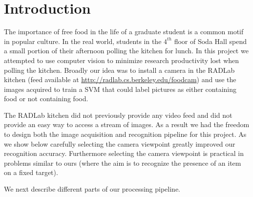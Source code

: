 \section{Introduction}
The importance of free food in the life of a graduate student is a common motif in popular culture. In the real world,
students in the $4^{th}$ floor of Soda Hall spend a small portion of their afternoon polling the kitchen for lunch. In
this project we attempted to use computer vision to minimize research productivity lost when polling the kitchen.
Broadly our idea was to install a camera in the RADLab kitchen (feed available at
\url{http://radlab.cs.berkeley.edu/foodcam}) and use the images acquired to train a SVM that could label pictures as
either containing food or not containing food. 

The RADLab kitchen did not previously provide any video feed and did not provide an easy way to access a stream of
images. As a result we had the freedom to design both the image acquisition and recognition pipeline for this project.
As we show below carefully selecting the camera viewpoint greatly improved our recognition accuracy. Furthermore
selecting the camera viewpoint is practical in problems similar to ours (where the aim is to recognize the presence of
an item on a fixed target). 

We next describe different parts of our processing pipeline.
